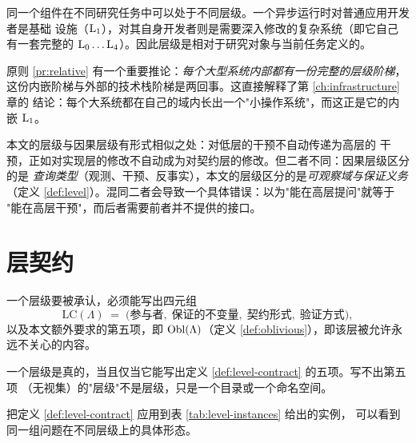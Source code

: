 \begin{principle}[层级的相对性与递归性]\label{pr:relative}
同一个组件在不同研究任务中可以处于不同层级。一个异步运行时对普通应用开发者是基础
设施（$\mathrm{L}_{1}$），对其自身开发者则是需要深入修改的复杂系统（即它自己有一套完整的
$\mathrm{L}_{0} \dots \mathrm{L}_{4}$）。因此层级是相对于研究对象与当前任务定义的。
\end{principle}

原则 \ref{pr:relative} 有一个重要推论：\emph{每个大型系统内部都有一份完整的层级阶梯}，
这份内嵌阶梯与外部的技术栈阶梯是两回事。这直接解释了第 \ref{ch:infrastructure} 章的
结论：每个大系统都在自己的域内长出一个"小操作系统"，而这正是它的内嵌 $\mathrm{L}_{1}$。

\begin{remark}[与因果层级的区别]\label{rmk:pearl}
本文的层级与因果层级\cite{pearl2009}有形式相似之处：对低层的干预不自动传递为高层的
干预，正如对实现层的修改不自动成为对契约层的修改。但二者不同：因果层级区分的是
\emph{查询类型}（观测、干预、反事实），本文的层级区分的是\emph{可观察域与保证义务}
（定义 \ref{def:level}）。混同二者会导致一个具体错误：以为"能在高层提问"就等于
"能在高层干预"，而后者需要前者并不提供的接口。
\end{remark}

\section{层契约}\label{sec:four-tuple}

\begin{definition}[层契约四元组]\label{def:level-contract}
一个层级要被承认，必须能写出四元组
\begin{equation}\label{eq:level-contract}
\mathrm{LC}(\Lambda) \;=\;
\bigl(\text{参与者},\; \text{保证的不变量},\; \text{契约形式},\;
\text{验证方式}\bigr),
\end{equation}
以及本文额外要求的第五项，即 $\operatorname{Obl}(\Lambda)$（定义
\ref{def:oblivious}），即该层被允许永远不关心的内容。
\end{definition}

\begin{principle}[层级的真实性判据]\label{pr:level-real}
一个层级是真的，当且仅当它能写出定义 \ref{def:level-contract} 的五项。写不出第五项
（无视集）的"层级"不是层级，只是一个目录或一个命名空间。
\end{principle}

把定义 \ref{def:level-contract} 应用到表 \ref{tab:level-instances} 给出的实例，
可以看到同一组问题在不同层级上的具体形态。

